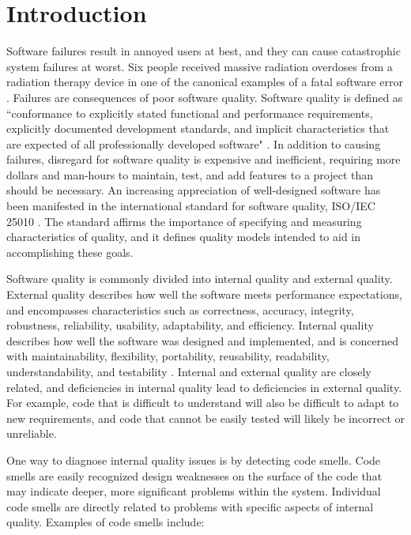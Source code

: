\documentclass{sig-alternate}
\begin{document}
\section{Introduction}
\label{sec:intro} Software failures result in annoyed users at best, and they can cause
catastrophic system failures at worst. Six people received massive radiation
overdoses from a radiation therapy device in one of the canonical examples of a
fatal software error \cite{leveson1995therac}. Failures are consequences of poor
software quality. Software quality is defined as ``conformance to explicitly
stated functional and performance requirements, explicitly documented
development standards, and implicit characteristics that are expected of all
professionally developed software" \cite{pressman1997}. In addition to causing
failures, disregard for software quality is expensive and inefficient, requiring
more dollars and man-hours to maintain, test, and add features to a project than
should be necessary. An increasing appreciation of well-designed software has
been manifested in the international standard for software quality, ISO/IEC
25010 \cite{iso2011iec}. The standard affirms the importance of specifying and measuring
characteristics of quality, and it defines quality models intended to aid in
accomplishing these goals. 

Software quality is commonly divided into internal quality and external quality.
External quality describes how well the software meets performance expectations,
and encompasses characteristics such as correctness, accuracy, integrity,
robustness, reliability, usability, adaptability, and efficiency. Internal
quality describes how well the software was designed and implemented, and is
concerned with maintainability, flexibility, portability, reusability,
readability, understandability, and testability
\cite{mcconnell1993codecomplete}. Internal and external quality are closely
related, and deficiencies in internal quality lead to deficiencies in external
quality. For example, code that is difficult to understand will also be
difficult to adapt to new requirements, and code that cannot be easily tested
will likely be incorrect or unreliable. 

One way to diagnose internal quality issues is by detecting code smells. Code
smells are easily recognized design weaknesses on the surface of the code that
may indicate deeper, more significant problems within the system. Individual code 
smells are directly related to problems with specific aspects of
internal quality. Examples of code smells include:
\end{document}
